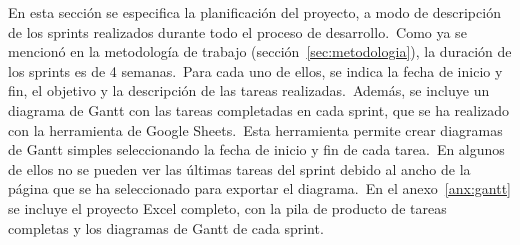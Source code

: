 
En esta sección se especifica la planificación del proyecto, a modo de descripción de los sprints realizados durante
todo el proceso de desarrollo.\ Como ya se mencionó
en la metodología de trabajo (sección~\ref{sec:metodologia}), la duración de los sprints es de 4 semanas.\ Para cada
uno de
ellos, se indica la fecha de inicio y fin, el objetivo y la descripción de las tareas realizadas.\ Además, se incluye
un diagrama de Gantt con las tareas completadas en cada sprint, que se ha realizado con la herramienta
 de Google Sheets.\ Esta herramienta permite crear diagramas de Gantt simples
seleccionando la fecha de inicio y fin de cada tarea.\ En algunos de ellos no se pueden ver las últimas tareas del
sprint debido al ancho de la página que se ha seleccionado para exportar el diagrama.\ En el anexo~\ref{anx:gantt}
se incluye el proyecto Excel completo, con la pila de producto de tareas completas y los diagramas de Gantt de cada
sprint.












